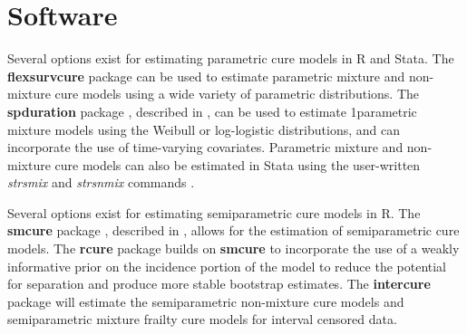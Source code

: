 
\section{Software}
		Several options exist for estimating parametric cure models in R and Stata. The \textbf{flexsurvcure} package \citep{amdahl2017} can be used to estimate parametric mixture and non-mixture cure models using a wide variety of parametric distributions. The \textbf{spduration} package \citep{beger2017a}, described in \citep{beger2017a}, can be used to estimate 1parametric mixture models using the Weibull or log-logistic distributions, and can incorporate the use of time-varying covariates. Parametric mixture and non-mixture cure models can also be estimated in Stata using the user-written \textit{strsmix} and \textit{strsnmix} commands \citep{lambert2007}.
		
		Several options exist for estimating semiparametric cure models in R. The \textbf{smcure} package \citep{cai2012a}, described in \citep{cai2012}, allows for the estimation of semiparametric cure models. The \textbf{rcure} package \citep{han2017} builds on \textbf{smcure} to incorporate the use of a weakly informative prior on the incidence portion of the model to reduce the potential for separation and produce more stable bootstrap estimates. The \textbf{intercure} package \citep{brettas2016} will estimate the semiparametric non-mixture cure models and semiparametric mixture frailty cure models for interval censored data. 

